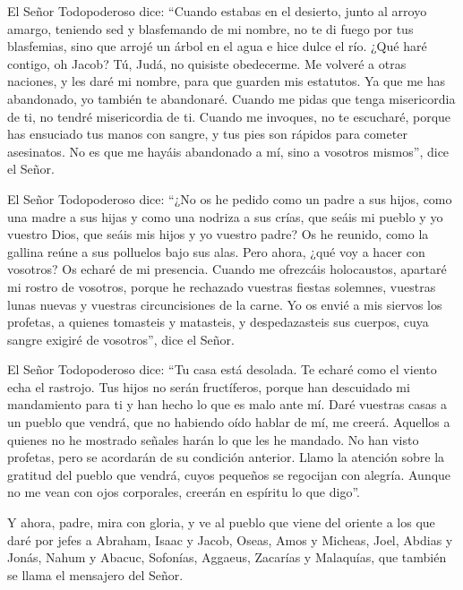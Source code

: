  El Señor Todopoderoso dice: ``Cuando estabas en el
desierto, junto al arroyo amargo, teniendo sed y blasfemando de mi
nombre,  no te di fuego por tus blasfemias, sino que
arrojé un árbol en el agua e hice dulce el río.  ¿Qué
haré contigo, oh Jacob? Tú, Judá, no quisiste obedecerme. Me volveré a
otras naciones, y les daré mi nombre, para que guarden mis estatutos.
 Ya que me has abandonado, yo también te abandonaré.
Cuando me pidas que tenga misericordia de ti, no tendré misericordia de
ti.  Cuando me invoques, no te escucharé, porque has
ensuciado tus manos con sangre, y tus pies son rápidos para cometer
asesinatos.  No es que me hayáis abandonado a mí, sino a
vosotros mismos'', dice el Señor.

 El Señor Todopoderoso dice: ``¿No os he pedido como un
padre a sus hijos, como una madre a sus hijas y como una nodriza a sus
crías,  que seáis mi pueblo y yo vuestro Dios, que seáis
mis hijos y yo vuestro padre?  Os he reunido, como la
gallina reúne a sus polluelos bajo sus alas. Pero ahora, ¿qué voy a
hacer con vosotros? Os echaré de mi presencia.  Cuando me
ofrezcáis holocaustos, apartaré mi rostro de vosotros, porque he
rechazado vuestras fiestas solemnes, vuestras lunas nuevas y vuestras
circuncisiones de la carne.  Yo os envié a mis siervos
los profetas, a quienes tomasteis y matasteis, y despedazasteis sus
cuerpos, cuya sangre exigiré de vosotros'', dice el Señor.

 El Señor Todopoderoso dice: ``Tu casa está desolada. Te
echaré como el viento echa el rastrojo.  Tus hijos no
serán fructíferos, porque han descuidado mi mandamiento para ti y han
hecho lo que es malo ante mí.  Daré vuestras casas a un
pueblo que vendrá, que no habiendo oído hablar de mí, me creerá.
Aquellos a quienes no he mostrado señales harán lo que les he mandado.
 No han visto profetas, pero se acordarán de su condición
anterior.  Llamo la atención sobre la gratitud del pueblo
que vendrá, cuyos pequeños se regocijan con alegría. Aunque no me vean
con ojos corporales, creerán en espíritu lo que digo''.

 Y ahora, padre, mira con gloria, y ve al pueblo que
viene del oriente  a los que daré por jefes a Abraham,
Isaac y Jacob, Oseas, Amos y Micheas, Joel, Abdias y Jonás,
 Nahum y Abacuc, Sofonías, Aggaeus, Zacarías y Malaquías,
que también se llama el mensajero del Señor.

